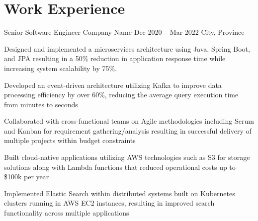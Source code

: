 \documentclass[letterpaper]{resume_config}
\begin{document}

\section{Work Experience}

\WorkExperience
    {Senior Software Engineer} %
    {Company Name} %
    {Dec 2020 -- Mar 2022} %
    {City, Province} %
    {
        \item Designed and implemented a microservices architecture using Java, Spring Boot, and JPA resulting in a 50\% reduction in application response time while increasing system scalability by 75\%.
        \item Developed an event-driven architecture utilizing Kafka to improve data processing efficiency by over 60\%, reducing the average query execution time from minutes to seconds
        \item Collaborated with cross-functional teams on Agile methodologies including Scrum and Kanban for requirement gathering/analysis resulting in successful delivery of multiple projects within budget constraints
        \item Built cloud-native applications utilizing AWS technologies such as S3 for storage solutions along with Lambda functions that reduced operational costs up to \$100k per year
        \item Implemented Elastic Search within distributed systems built on Kubernetes clusters running in AWS EC2 instances, resulting in improved search functionality across multiple applications
    } 
\end{document}
